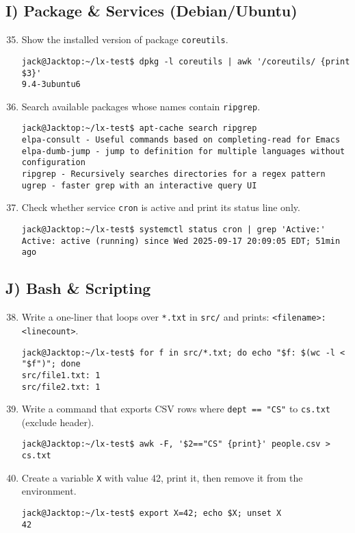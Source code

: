 \subsection*{I) Package \& Services (Debian/Ubuntu)}
\begin{enumerate}
  \setcounter{enumi}{34}
  \item Show the installed version of package \texttt{coreutils}.
\begin{verbatim}
jack@Jacktop:~/lx-test$ dpkg -l coreutils | awk '/coreutils/ {print $3}'
9.4-3ubuntu6
    \end{verbatim}
  \item Search available packages whose names contain \texttt{ripgrep}.
\begin{verbatim}
jack@Jacktop:~/lx-test$ apt-cache search ripgrep
elpa-consult - Useful commands based on completing-read for Emacs
elpa-dumb-jump - jump to definition for multiple languages without configuration
ripgrep - Recursively searches directories for a regex pattern
ugrep - faster grep with an interactive query UI
    \end{verbatim}
  \item Check whether service \texttt{cron} is active and print its status line only.
\begin{verbatim}
jack@Jacktop:~/lx-test$ systemctl status cron | grep 'Active:'
Active: active (running) since Wed 2025-09-17 20:09:05 EDT; 51min ago
    \end{verbatim}
\end{enumerate}

\subsection*{J) Bash \& Scripting}
\begin{enumerate}
  \setcounter{enumi}{37}
  \item Write a one-liner that loops over \texttt{*.txt} in \texttt{src/} and prints: \texttt{<filename>: <linecount>}.
\begin{verbatim}
jack@Jacktop:~/lx-test$ for f in src/*.txt; do echo "$f: $(wc -l < "$f")"; done
src/file1.txt: 1
src/file2.txt: 1
    \end{verbatim}

  \item Write a command that exports CSV rows where \texttt{dept == "CS"} to \texttt{cs.txt} (exclude header).
\begin{verbatim}
jack@Jacktop:~/lx-test$ awk -F, '$2=="CS" {print}' people.csv > cs.txt
    \end{verbatim}
  \item Create a variable \texttt{X} with value 42, print it, then remove it from the environment.
\begin{verbatim}
jack@Jacktop:~/lx-test$ export X=42; echo $X; unset X
42
    \end{verbatim}
\end{enumerate}



